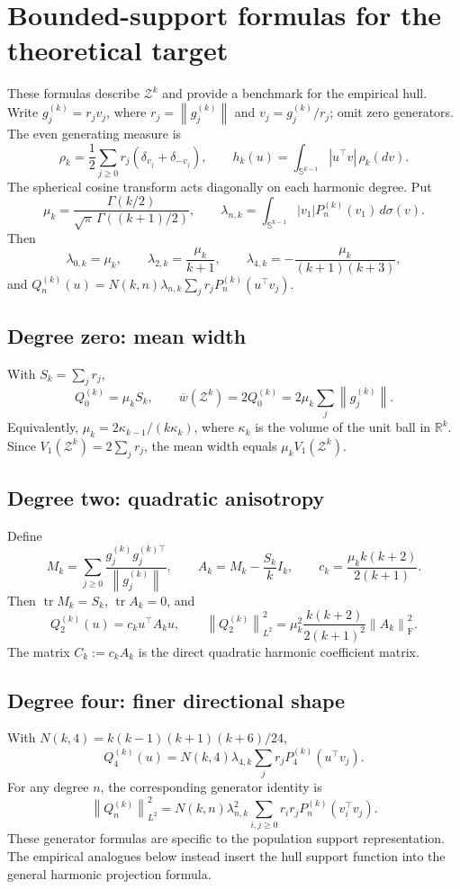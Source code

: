 \documentclass[11pt,a4paper]{article}
\newcommand{\Sph}{\mathbb S}
\newcommand{\R}{\mathbb R}
\newcommand{\norm}[1]{\left\lVert #1\right\rVert}
\newcommand{\tr}{\operatorname{tr}}
\newcommand{\Frob}{\mathrm F}
\begin{document}
\newpage
\section{Bounded-support formulas for the theoretical target}\label{sec:population}
These formulas describe $\mathcal Z^k$ and provide a benchmark for the empirical
hull. Write $g_j^{(k)}=r_jv_j$, where $r_j=\norm{g_j^{(k)}}$ and $v_j=g_j^{(k)}/r_j$;
omit zero generators. The even generating measure is
\[
 \rho_k=\frac12\sum_{j\ge0}r_j(\delta_{v_j}+\delta_{-v_j}),\qquad
 h_k(u)=\int_{\Sph^{k-1}}|u^\top v|\,\rho_k(dv).
\]
The spherical cosine transform acts diagonally on each harmonic degree. Put
\[
 \mu_k=\frac{\Gamma(k/2)}{\sqrt\pi\,\Gamma((k+1)/2)},\qquad
 \lambda_{n,k}=\int_{\Sph^{k-1}}|v_1|P_n^{(k)}(v_1)\,d\sigma(v).
\]
Then
\[
 \lambda_{0,k}=\mu_k,\qquad
 \lambda_{2,k}=\frac{\mu_k}{k+1},\qquad
 \lambda_{4,k}=-\frac{\mu_k}{(k+1)(k+3)},
\]
and $Q_n^{(k)}(u)=N(k,n)\lambda_{n,k}\sum_jr_jP_n^{(k)}(u^\top v_j)$.

\subsection*{Degree zero: mean width}
With $S_k=\sum_jr_j$,
\[
 \boxed{\quad Q_0^{(k)}=\mu_k S_k,\qquad
 \overline w(\mathcal Z^k)=2Q_0^{(k)}=2\mu_k\sum_j\norm{g_j^{(k)}}.\quad}
\]
Equivalently, $\mu_k=2\kappa_{k-1}/(k\kappa_k)$, where $\kappa_k$ is the volume
of the unit ball in $\R^k$. Since $V_1(\mathcal Z^k)=2\sum_jr_j$,
the mean width equals $\mu_k V_1(\mathcal Z^k)$.

\subsection*{Degree two: quadratic anisotropy}
Define
\[
 M_k=\sum_{j\ge0}\frac{g_j^{(k)}g_j^{(k)\top}}{\norm{g_j^{(k)}}},\qquad
 A_k=M_k-\frac{S_k}{k}I_k,\qquad
 c_k=\frac{\mu_k k(k+2)}{2(k+1)}.
\]
Then $\tr M_k=S_k$, $\tr A_k=0$, and
\[
 \boxed{\quad Q_2^{(k)}(u)=c_k u^\top A_ku,\qquad
 \norm{Q_2^{(k)}}_{L^2}^2=
 \mu_k^2\frac{k(k+2)}{2(k+1)^2}\norm{A_k}_{\Frob}^2.\quad}
\]
The matrix $C_k:=c_kA_k$ is the direct quadratic harmonic coefficient matrix.

\subsection*{Degree four: finer directional shape}
With $N(k,4)=k(k-1)(k+1)(k+6)/24$,
\[
 Q_4^{(k)}(u)=N(k,4)\lambda_{4,k}\sum_jr_jP_4^{(k)}(u^\top v_j).
\]
For any degree $n$, the corresponding generator identity is
\[
 \norm{Q_n^{(k)}}_{L^2}^2
 =N(k,n)\lambda_{n,k}^2\sum_{i,j\ge0}r_ir_jP_n^{(k)}(v_i^\top v_j).
\]
These generator formulas are specific to the population support representation.
The empirical analogues below instead insert the hull support function into the
general harmonic projection formula.
\end{document}
